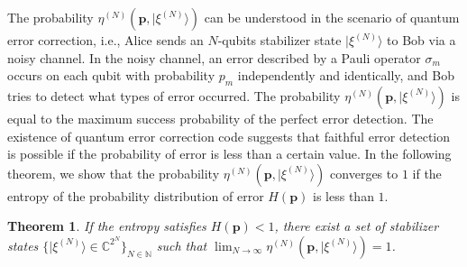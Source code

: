\documentclass[aps,prx,twocolumn,showpacs,amsmath,notitlepage,amssymb,superscriptaddress]{revtex4-1}
\newcommand{\ket}[1]{| {#1} \rangle}
\newtheorem{theorem}{Theorem}
\begin{document}
The probability $\eta^{(N)}(\mathbf{p},\ket{\xi^{(N)}})$ can be understood in the scenario of quantum error correction, i.e., Alice sends an $N$-qubits stabilizer state $\ket{\xi^{(N)}}$ to Bob via a noisy channel. In the noisy channel, an error described by a Pauli operator $\sigma_{m}$ occurs on each qubit with probability $p_m$ independently and identically, and Bob tries to detect what types of error occurred. The probability $\eta^{(N)}(\mathbf{p},\ket{\xi^{(N)}})$ is equal to the maximum success probability of the perfect error detection. The existence of quantum error correction code suggests that faithful error detection is possible if the probability of error is less than a certain value. In the following theorem, we show that the probability $\eta^{(N)}(\mathbf{p},\ket{\xi^{(N)}})$ converges to $1$ if the entropy of the probability distribution of error $H(\mathbf{p})$ is less than $1$.

\begin{theorem}
\label{theorem:revival}
 If the entropy satisfies $H(\mathbf{p})<1$, there exist a set of stabilizer states $\{\ket{\xi^{(N)}}\in\mathbb{C}^{2^N}\}_{N\in\mathbb{N}}$ such that $\lim_{N\rightarrow\infty} \eta^{(N)}(\mathbf{p},\ket{\xi^{(N)}})=1$.
\end{theorem}
\end{document}
